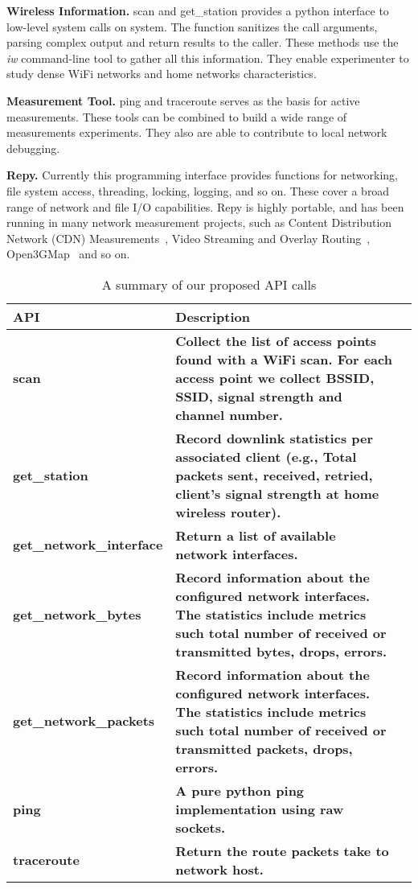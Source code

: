 \textbf{Wireless Information.} scan and get\_station provides a python interface to low-level system calls on system. The function sanitizes the call arguments, parsing complex output and return results to the caller. These methods use the \emph{iw} command-line tool 
to gather all this information. They enable experimenter to study dense WiFi networks and home networks characteristics.

\textbf{Measurement Tool.} ping and traceroute serves as the basis for active measurements. These tools can be combined to build a wide range of measurements experiments. They also are able to contribute to local network debugging.

\textbf{Repy.} Currently this programming interface provides functions for networking, file system access, threading, locking, logging, and so on. These cover a broad range of network and file I/O capabilities. Repy is highly portable, and has been running  in many network measurement projects, such as Content Distribution Network (CDN) Measurements~\cite{rafetseder2011exploring}, Video Streaming and Overlay Routing~\cite{eisl2011service}, Open3GMap~\cite{open3gmap} and so on.

\begin{table*}
\scriptsize
\centering
\begin{tabular}{|p{}| p{}| m{}|}
\hline
\textbf{API}    &  \textbf{Description} \\
 \hline
 {\bf scan} & {\bf Collect the list of access points found with a WiFi scan. For each access point we collect BSSID, SSID, signal strength and channel number.} \\
\hline
 {\bf get\_station} & {\bf Record downlink statistics per associated client (e.g., Total packets sent, received, retried, client's signal strength at home wireless router).} \\
\hline
 {\bf get\_network\_interface} & {\bf Return a list of available network interfaces.} \\
\hline
 {\bf get\_network\_bytes} & {\bf Record information about the configured network interfaces. The statistics include metrics such total number of received or transmitted bytes, drops, errors.} \\
\hline
 {\bf get\_network\_packets} & {\bf Record information about the configured network interfaces. The statistics include metrics such total number of received or transmitted packets, drops, errors.} \\
\hline
 {\bf ping} & {\bf A pure python ping implementation using raw sockets.} \\
\hline
 {\bf traceroute} & {\bf Return the route packets take to network host. } \\
\hline
\end{tabular}
\caption {A summary of our proposed API calls}
\label{table:new_api}
\end{table*}

